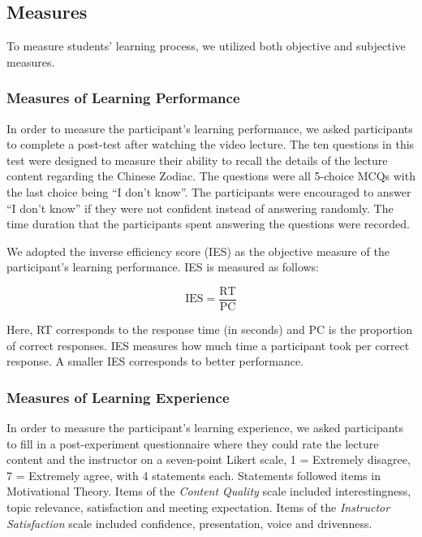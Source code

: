 \documentclass{sigchi}
\begin{document}
\subsection{Measures}
To measure students' learning process, we utilized both objective and subjective measures.

\subsubsection{Measures of Learning Performance}
In order to measure the participant's learning performance, we asked participants to complete a post-test after watching the video lecture. The ten questions in this test were designed to measure their ability to recall the details of the lecture content regarding the Chinese Zodiac. The questions were all 5-choice MCQs with the last choice being ``I don't know''. The participants were encouraged to answer ``I don't know'' if they were not confident instead of answering randomly. The time duration that the participants spent answering the questions were recorded.

We adopted the inverse efficiency score (IES) \cite{bruyer2011combining} as the objective measure of the participant's learning performance. IES is measured as follows:

\begin{equation}
\text{IES}=\frac{\text{RT}}{\text{PC}}
\end{equation}

Here, RT corresponds to the response time (in seconds) and PC is the proportion of correct responses. IES measures how much time a participant took per correct response. A smaller IES corresponds to better performance.

\subsubsection{Measures of Learning Experience}

In order to measure the participant's learning experience, we asked participants to fill in a post-experiment questionnaire where they could rate the lecture content and the instructor on a seven-point Likert scale, 1 = Extremely disagree, 7 = Extremely agree, with 4 statements each. Statements followed items in Motivational Theory. Items of the \textit{Content Quality} scale included interestingness, topic relevance, satisfaction and meeting expectation. Items of the \textit{Instructor Satisfaction} scale included confidence, presentation, voice and drivenness.
\end{document}
